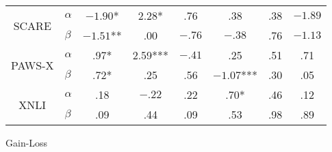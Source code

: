 {{\begin{tabular}{llcccccc}
      \multicolumn{1}{c}{\multirow{2}{*}{SCARE}}   & $\alpha$  & \multicolumn{1}{c|}{\cellcolor{dark-blue} $-1.90$*}   & \multicolumn{1}{c|}{\cellcolor{dark-blue} 2.28*}     & \multicolumn{1}{c|}{\cellcolor{dark-blue} .76}        & \multicolumn{1}{c|}{\cellcolor{dark-blue} .38}         & \multicolumn{1}{c|}{\cellcolor{dark-blue} .38}      & \multicolumn{1}{c}{\cellcolor{blue} $-1.89$}        \\
      \multicolumn{1}{c}{}                         & $\beta$   & \multicolumn{1}{c|}{\cellcolor{blue} $-1.51$**}       & \multicolumn{1}{c|}{\cellcolor{llight-blue} .00}     & \multicolumn{1}{c|}{\cellcolor{blue} $-.76$}          & \multicolumn{1}{c|}{\cellcolor{dark-blue} $-.38$}      & \multicolumn{1}{c|}{\cellcolor{blue} .76}           & \multicolumn{1}{c}{\cellcolor{dark-blue} $-1.13$}   \\ \hline
      \multicolumn{1}{c}{\multirow{2}{*}{PAWS-X}}  & $\alpha$  & \multicolumn{1}{c|}{\cellcolor{blue} .97*}            & \multicolumn{1}{c|}{\cellcolor{dark-blue} 2.59***}   & \multicolumn{1}{c|}{\cellcolor{blue} $-.41$}          & \multicolumn{1}{c|}{\cellcolor{dark-blue} .25}         & \multicolumn{1}{c|}{\cellcolor{llight-blue} .51}     & \multicolumn{1}{c}{\cellcolor{dark-blue} .71}       \\
      \multicolumn{1}{c}{}                         & $\beta$   & \multicolumn{1}{c|}{\cellcolor{dark-blue} .72*}       & \multicolumn{1}{c|}{\cellcolor{dark-blue} .25}       & \multicolumn{1}{c|}{\cellcolor{blue} .56}             & \multicolumn{1}{c|}{\cellcolor{dark-blue} $-1.07$***}  & \multicolumn{1}{c|}{\cellcolor{dark-blue} .30}      & \multicolumn{1}{c}{\cellcolor{dark-blue} .05}       \\ \cline{3-8}
      \multicolumn{1}{c}{\multirow{2}{*}{XNLI}}    & $\alpha$  & \multicolumn{1}{c|}{\cellcolor{blue} .18}             & \multicolumn{1}{c|}{\cellcolor{blue} $-.22$}         & \multicolumn{1}{c|}{\cellcolor{blue} .22}             & \multicolumn{1}{c|}{\cellcolor{blue} .70*}             & \multicolumn{1}{c|}{\cellcolor{dark-blue} .46}      & \multicolumn{1}{c}{\cellcolor{dark-blue} .12}       \\
      \multicolumn{1}{c}{}                         & $\beta$   & \multicolumn{1}{c|}{\cellcolor{blue} .09}             & \multicolumn{1}{c|}{\cellcolor{dark-blue} .44}       & \multicolumn{1}{c|}{\cellcolor{dark-blue} .09}        & \multicolumn{1}{c|}{\cellcolor{blue} .53}              & \multicolumn{1}{c|}{\cellcolor{blue} .98}           & \multicolumn{1}{c}{\cellcolor{dark-blue} .89}       \\ %
     \end{tabular}
    }
  }{Gain-Loss}

